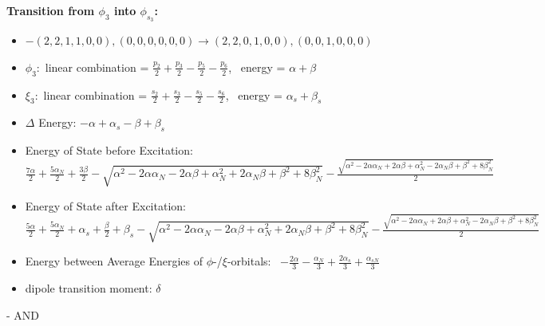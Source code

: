 \documentclass[12pt,a4paper]{article}
\begin{document}
\begin{itemize}
        \end{itemize}
        

        \noindent\textbf{Transition from $\phi_{3}$ into $\phi_{s_{3}}$:}
        \begin{itemize}
            \item $- (2, 2, 1, 1, 0, 0), (0, 0, 0, 0, 0, 0) \rightarrow (2, 2, 0, 1, 0, 0), (0, 0, 1, 0, 0, 0)$
        
            \item $\phi_{3}:$ linear combination = $\frac{p_{2}}{2} + \frac{p_{3}}{2} - \frac{p_{5}}{2} - \frac{p_{6}}{2}$, \
            energy = $\alpha + \beta$
            
            \item $\xi_{3}:$ linear combination = $\frac{s_{2}}{2} + \frac{s_{3}}{2} - \frac{s_{5}}{2} - \frac{s_{6}}{2}$, \
            energy = $\alpha_{s} + \beta_{s}$
            
            \item $\Delta$ Energy: $- \alpha + \alpha_{s} - \beta + \beta_{s}$
            \item Energy of State before Excitation: $\frac{7 \alpha}{2} + \frac{5 \alpha_{N}}{2} + \frac{3 \beta}{2} - \sqrt{\alpha^{2} - 2 \alpha \alpha_{N} - 2 \alpha \beta + \alpha_{N}^{2} + 2 \alpha_{N} \beta + \beta^{2} + 8 \beta_{N}^{2}} - \frac{\sqrt{\alpha^{2} - 2 \alpha \alpha_{N} + 2 \alpha \beta + \alpha_{N}^{2} - 2 \alpha_{N} \beta + \beta^{2} + 8 \beta_{N}^{2}}}{2}$
            \item Energy of State after Excitation: $\frac{5 \alpha}{2} + \frac{5 \alpha_{N}}{2} + \alpha_{s} + \frac{\beta}{2} + \beta_{s} - \sqrt{\alpha^{2} - 2 \alpha \alpha_{N} - 2 \alpha \beta + \alpha_{N}^{2} + 2 \alpha_{N} \beta + \beta^{2} + 8 \beta_{N}^{2}} - \frac{\sqrt{\alpha^{2} - 2 \alpha \alpha_{N} + 2 \alpha \beta + \alpha_{N}^{2} - 2 \alpha_{N} \beta + \beta^{2} + 8 \beta_{N}^{2}}}{2}$
            \item Energy between Average Energies of $\phi$-/$\xi$-orbitals: \
            $- \frac{2 \alpha}{3} - \frac{\alpha_{N}}{3} + \frac{2 \alpha_{s}}{3} + \frac{\alpha_{s N}}{3}$
        
            \item dipole transition moment: $\delta$
        
        \end{itemize}
        
 -  AND 
\end{document}
